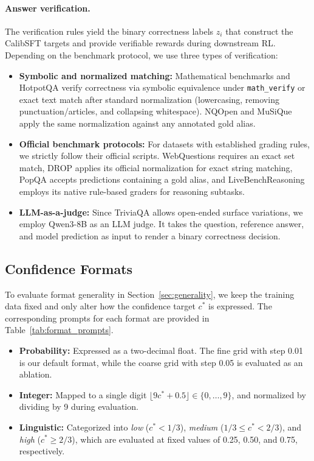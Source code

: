\documentclass{article} %
\begin{document}
\paragraph{Answer verification.}
The verification rules yield the binary correctness labels $z_i$ that construct the CalibSFT targets and provide verifiable rewards during downstream RL.
Depending on the benchmark protocol, we use three types of verification:
\begin{itemize}[leftmargin=*,itemsep=2pt,topsep=2pt]
   \item \textbf{Symbolic and normalized matching:} Mathematical benchmarks and HotpotQA verify correctness via symbolic equivalence under \texttt{math\_verify} or exact text match after standard normalization (lowercasing, removing punctuation/articles, and collapsing whitespace). NQOpen and MuSiQue apply the same normalization against any annotated gold alias.    
   \item \textbf{Official benchmark protocols:} For datasets with established grading rules, we strictly follow their official scripts. WebQuestions requires an exact set match, DROP applies its official normalization for exact string matching, PopQA accepts predictions containing a gold alias, and LiveBenchReasoning employs its native rule-based graders for reasoning subtasks. 
    \item \textbf{LLM-as-a-judge:} Since TriviaQA allows open-ended surface variations, we employ Qwen3-8B as an LLM judge. It takes the question, reference answer, and model prediction as input to render a binary correctness decision.
\end{itemize}



\subsection{Confidence Formats}
\label{sec:format_details}
To evaluate format generality in Section~\ref{sec:generality}, we keep the training data fixed and only alter how the confidence target $c^*$ is expressed.
The corresponding prompts for each format are provided in Table~\ref{tab:format_prompts}.

\begin{itemize}[leftmargin=*,itemsep=2pt,topsep=2pt]
    \item \textbf{Probability:} Expressed as a two-decimal float. The fine grid with step 0.01 is our default format, while the coarse grid with step 0.05 is evaluated as an ablation.
    
    \item \textbf{Integer:} Mapped to a single digit $\lfloor 9c^* + 0.5 \rfloor \in \{0, \ldots, 9\}$, and normalized by dividing by 9 during evaluation.
    
    \item \textbf{Linguistic:} Categorized into \emph{low} ($c^* < 1/3$), \emph{medium} ($1/3 \le c^* < 2/3$), and \emph{high} ($c^* \ge 2/3$), which are evaluated at fixed values of 0.25, 0.50, and 0.75, respectively.
\end{itemize}
\end{document}
